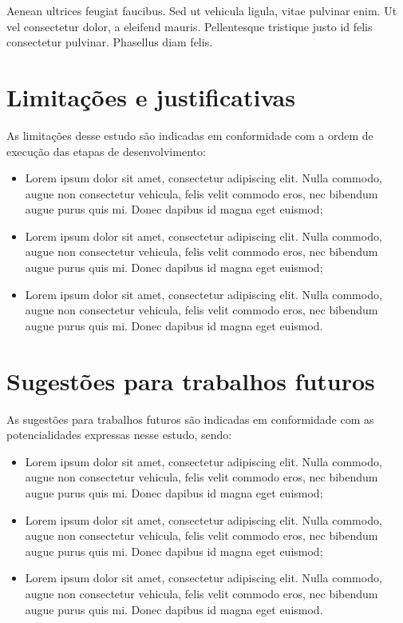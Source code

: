 \documentclass[brazil,hardcopy,openany,a5paper]{ufscthesis}
\begin{document}
Aenean ultrices feugiat faucibus. Sed ut vehicula ligula, vitae pulvinar enim. Ut vel consectetur dolor, a eleifend mauris. Pellentesque tristique justo id felis consectetur pulvinar. Phasellus diam felis.


\section{Limitações e justificativas}

As limitações desse estudo são indicadas em conformidade com a ordem de execução das etapas de desenvolvimento:

\begin{itemize}
	\item Lorem ipsum dolor sit amet, consectetur adipiscing elit. Nulla commodo, augue non consectetur vehicula, felis velit commodo eros, nec bibendum augue purus quis mi. Donec dapibus id magna eget euismod;
	
	\item Lorem ipsum dolor sit amet, consectetur adipiscing elit. Nulla commodo, augue non consectetur vehicula, felis velit commodo eros, nec bibendum augue purus quis mi. Donec dapibus id magna eget euismod;
	
	\item Lorem ipsum dolor sit amet, consectetur adipiscing elit. Nulla commodo, augue non consectetur vehicula, felis velit commodo eros, nec bibendum augue purus quis mi. Donec dapibus id magna eget euismod.
	
\end{itemize}

\section{Sugestões para trabalhos futuros}

As sugestões para trabalhos futuros são indicadas em conformidade com as potencialidades expressas nesse estudo, sendo:

\begin{itemize}
	\item Lorem ipsum dolor sit amet, consectetur adipiscing elit. Nulla commodo, augue non consectetur vehicula, felis velit commodo eros, nec bibendum augue purus quis mi. Donec dapibus id magna eget euismod;

	\item Lorem ipsum dolor sit amet, consectetur adipiscing elit. Nulla commodo, augue non consectetur vehicula, felis velit commodo eros, nec bibendum augue purus quis mi. Donec dapibus id magna eget euismod;

	\item Lorem ipsum dolor sit amet, consectetur adipiscing elit. Nulla commodo, augue non consectetur vehicula, felis velit commodo eros, nec bibendum augue purus quis mi. Donec dapibus id magna eget euismod.
	
\end{itemize}
\end{document}
